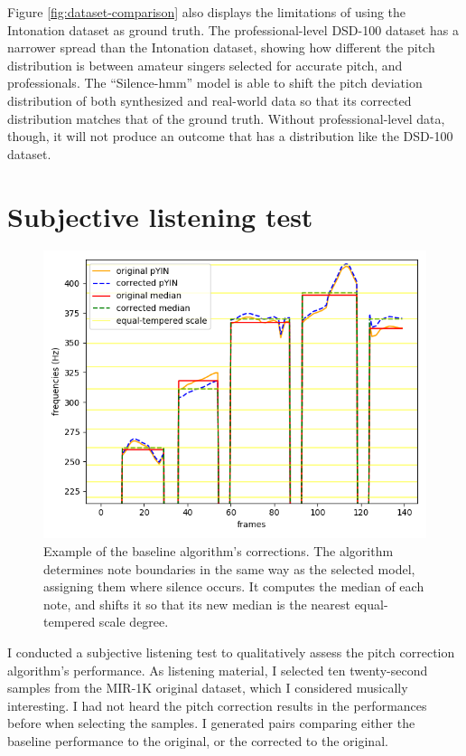 Figure \ref{fig:dataset-comparison} also displays the limitations of using the Intonation dataset as ground truth. The professional-level DSD-100 dataset has a narrower spread than the Intonation dataset, showing how different the pitch distribution is between amateur singers selected for accurate pitch, and professionals. The ``Silence-\gls{hmm}'' model is able to shift the pitch deviation distribution of both synthesized and real-world data so that its corrected distribution matches that of the ground truth. Without professional-level data, though, it will not produce an outcome that has a distribution like the DSD-100 dataset.


\section{Subjective listening test}
\label{sec:subjective-test}
\begin{figure}[t!]
    \centering
    \includegraphics[width=12cm]{figures/baseline_tuning.png}
    \caption{Example of the baseline algorithm's corrections. The algorithm determines note boundaries in the same way as the selected model, assigning them where silence occurs. It computes the median of each note, and shifts it so that its new median is the nearest equal-tempered scale degree.}
    \label{fig:baseline_tuning}
\end{figure}

I conducted a subjective listening test to qualitatively assess the pitch correction algorithm's performance. As listening material, I selected ten twenty-second samples from the MIR-1K original dataset, which I considered musically interesting. I had not heard the pitch correction results in the performances before when selecting the samples. I generated pairs comparing either the baseline performance to the original, or the corrected to the original. 

